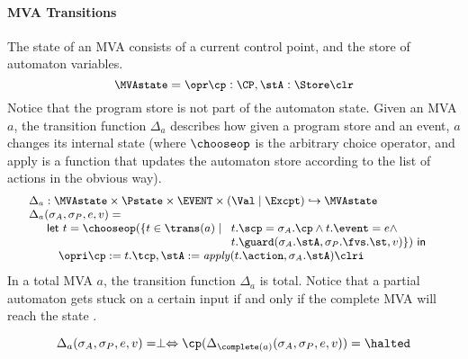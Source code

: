 
\paragraph{MVA Transitions} The state of an MVA consists of a current control
point, and the store of automaton variables.
\[{\small
\MVAstate = \opr \cp : \CP, \stA : \Store \clr}
\]
Notice that the program store is not part of the automaton
state. Given an MVA \(a\), the transition function \(\Delta_a\)
describes how given a program store and an event, \(a\) changes its
internal state (where \(\chooseop\) is the arbitrary choice operator,
and \textsf{apply} is a function that updates the automaton store
according to the list of actions in the obvious way).
\[{\small
\begin{array}{l}
\Delta_a  :  \MVAstate \times \Pstate \times \EVENT \times (\Val \mid
\Excpt) \hookrightarrow
\MVAstate\\
\Delta_a(\sigma_A, \sigma_P, e, v) = \\
\quad
\begin{array}[t]{l}
\mathsf{let\ }t = \chooseop(\{t\in \trans(a)\mid
  \begin{array}[t]{l}
     t.\scp = \sigma_A.\cp \wedge t.\event = e \wedge \\
     t.\guard(\sigma_A.\stA, \sigma_P.\fvs.\st, v)\}) \mathsf{\ in}
  \end{array}\\
\quad \opri \cp := t.\tcp, \stA := \mathit{apply}(t.\action,
\sigma_A.\stA) \clri
\end{array}

\end{array}}
\]
In a total MVA $a$, the transition function \(\Delta_a\) is total. Notice
that a partial automaton gets stuck on a certain input if and only if the
complete MVA will reach the state \halted.

\begin{equation}\label{MVAcompletionProp}
\Delta_a(\sigma_A, \sigma_P, e, v) = \perp \Leftrightarrow
\cp (\Delta_{\complete(a)}(\sigma_A, \sigma_P, e, v)) = \halted
\end{equation}


